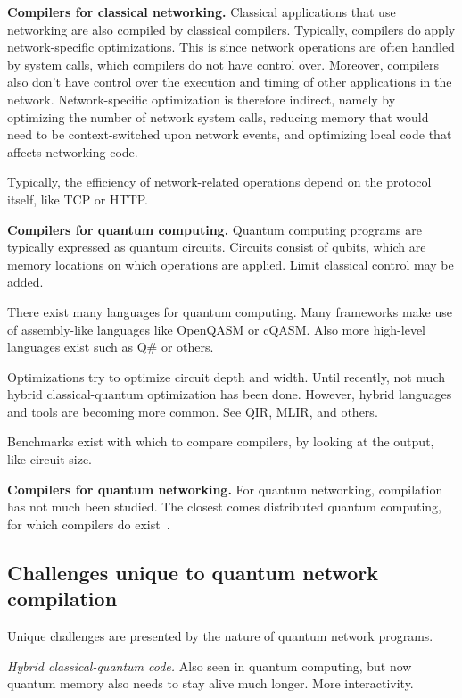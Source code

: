 \textbf{Compilers for classical networking.}
Classical applications that use networking are also compiled by classical compilers.
Typically, compilers do apply network-specific optimizations.
This is since network operations are often handled by system calls, which compilers do not have control over.
Moreover, compilers also don't have control over the execution and timing of other applications in the network.
Network-specific optimization is therefore indirect, namely by optimizing the number of network system calls, reducing memory that would need to be context-switched upon network events, and optimizing local code that affects networking code.

Typically, the efficiency of network-related operations depend on the protocol itself, like TCP or HTTP. 

\textbf{Compilers for quantum computing.}
Quantum computing programs are typically expressed as quantum circuits.
Circuits consist of qubits, which are memory locations on which operations are applied.
Limit classical control may be added.

There exist many languages for quantum computing.
Many frameworks make use of assembly-like languages like OpenQASM or cQASM.
Also more high-level languages exist such as Q\# or others.

Optimizations try to optimize circuit depth and width.
Until recently, not much hybrid classical-quantum optimization has been done.
However, hybrid languages and tools are becoming more common.
See QIR, MLIR, and others.

Benchmarks exist with which to compare compilers, by looking at the output, like circuit size.

\textbf{Compilers for quantum networking.}
For quantum networking, compilation has not much been studied.
The closest comes distributed quantum computing, for which compilers do exist~\cite{ferrari_compiler_2021, chatterjee_qurzon_2022, cuomo_optimized_2023, ferrari_modular_2023}.




\subsection{Challenges unique to quantum network compilation}
Unique challenges are presented by the nature of quantum network programs.

\textit{Hybrid classical-quantum code.} Also seen in quantum computing, but now quantum memory also needs to stay alive much longer. More interactivity.

